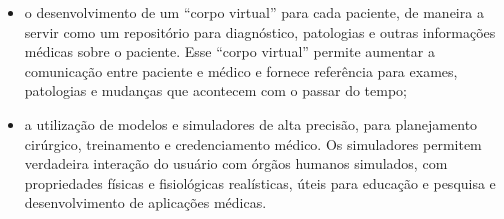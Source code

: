 \begin{itemize}
\begin{itemize}
			\item o desenvolvimento de um “corpo virtual” para cada paciente, de
				maneira a servir como um repositório para diagnóstico,
				patologias e outras informações médicas sobre o paciente.  Esse
				“corpo virtual” permite aumentar a comunicação entre paciente e
				médico e fornece referência para exames, patologias e mudanças
				que acontecem com o passar do tempo;

			\item a utilização de modelos e simuladores de alta precisão, para
				planejamento cirúrgico, treinamento e credenciamento médico. Os
				simuladores permitem verdadeira interação do usuário com órgãos
				humanos simulados, com propriedades físicas e fisiológicas
				realísticas, úteis para educação e pesquisa e desenvolvimento de
				aplicações médicas.

		\end{itemize}

\end{itemize}
